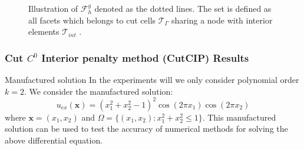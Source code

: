 \begin{frame}
\begin{block}{}
\begin{figure}

\caption{Illustration of $\mathcal{F} _{h}^{g}$ denoted as the dotted lines. The set is defined as all facets which belongs to cut cells $\mathcal{T} _{\Gamma }$ sharing a node with interior elements $\mathcal{T} _{int }$ .  }
\label{fig:illustration_F_g}
\end{figure}
\end{block}

\end{frame}


\begin{frame}
\frametitle{ Cut $C^0$ Interior penalty method (CutCIP) Results }


\begin{block}{Manufactured solution}
    In the experiments will we only consider polynomial order $k=2$.
We consider the manufactured solution:
$$
u_{ex}(\mathbf{x}) = \left(x_1^2 + x_2^2 - 1\right)^2 \cos(2\pi x_1) \cos(2\pi x_2)
$$
where $\mathbf{x}=(x_1,x_2)$ and $\Omega=\{(x_1,x_2): x_1^2 + x_2^2 \le  1\}$.
This manufactured solution can be used to test the accuracy of numerical methods for solving the above differential equation.
\end{block}
\end{frame}


